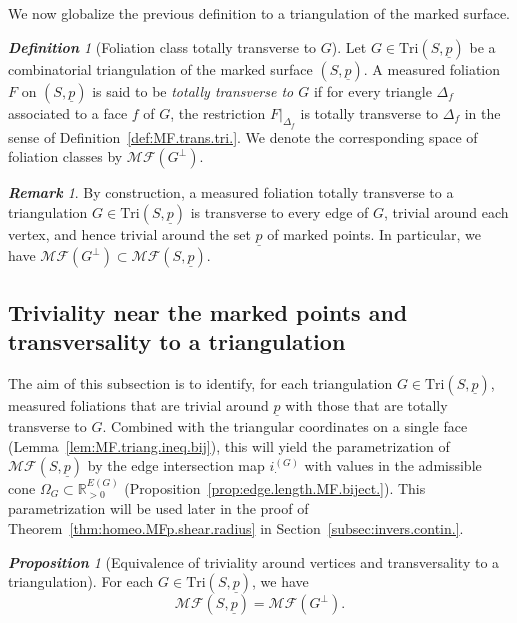 \documentclass[11pt, letterpaper]{amsart}
\theoremstyle{definition}
\theoremstyle{remark}
\newtheorem{proposition}[theorem]{\rm\bf Proposition}
\newtheorem{definition}[theorem]{\rm\bf Definition}
\newtheorem{remark}[theorem]{\rm\bf Remark}
\newcommand{\up}{\underline{p}}
\newcommand{\Sp}{(S,\up)}
\newcommand{\TSp}{\text{Tri}\Sp}
\newcommand{\iG}{i^{(G)}}
\newcommand{\cMF}{\mathcal{MF}}
\newcommand{\cMFp}{\mathcal{MF} (S,\up)}
\newcommand{\bR}{\mathbb{R}}
\newcommand{\DEF}{} \newcommand{\WARN}{\textcolor{red}} \newcommand{\ALT}{\textcolor{brown}} \newcommand{\TODO}{\textcolor{teal}} %
\numberwithin{equation}{section}
\begin{document}
We now globalize the previous definition to a triangulation of the marked surface.

\begin{definition}[Foliation class totally transverse to $G$]
    \label{def:MF.trans.triang.surf.}
Let $G\in \TSp$ be a combinatorial triangulation of the marked surface $\Sp$.
A measured foliation $F$ on $\Sp$ is said to be \DEF{\em totally transverse to $G$} if for every triangle $\Delta_f$ associated to a face $f$ of $G$, the restriction $F|_{\Delta_f}$ is totally transverse to $\Delta_f$ in the sense of Definition~\ref{def:MF.trans.tri.}.
We denote the corresponding space of foliation classes by $\cMF(G^{\perp})$.
\end{definition}

\begin{remark}
\label{rem:MF.Gperp.to.MFp}
By construction, a measured foliation totally transverse to a triangulation \(G\in\TSp\) is transverse to every edge of \(G\), trivial around each vertex, and hence trivial around the set \(\up\) of marked points.
In particular, we have \(\cMF(G^{\perp}) \subset \cMFp\).
\end{remark}




    
\subsection{Triviality near the marked points and transversality to a triangulation}


The aim of this subsection is to identify, for each triangulation \(G \in \TSp\), measured foliations that are trivial around \(\up\) with those that are totally transverse to \(G\).
Combined with the triangular coordinates on a single face (Lemma~\ref{lem:MF.triang.ineq.bij}), this will yield the parametrization of \(\cMFp\) by the edge intersection map \(\iG_{\cdot}\) with values in the admissible cone \(\Omega_G \subset \bR^{E(G)}_{>0}\) (Proposition~\ref{prop:edge.length.MF.biject.}).  This parametrization will be used later in the proof of Theorem~\ref{thm:homeo.MFp.shear.radius} in Section~\ref{subsec:invers.contin.}.

\begin{proposition}[Equivalence of triviality around vertices and transversality to a triangulation]
 \label{prop:t.a.imply.t.t.G}
    For each \(G\in\TSp\), we have
    \[
        \cMFp = \cMF(G^{\perp}).
    \]
\end{proposition}
\end{document}

